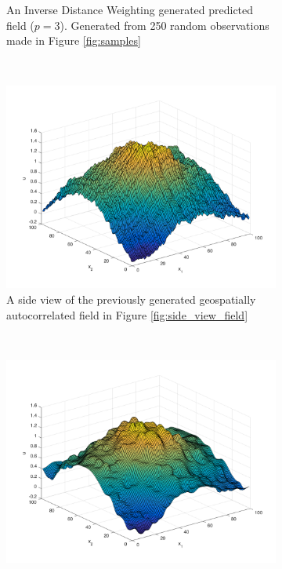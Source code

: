 \documentclass[11pt]{ucthesis}
\begin{document}
\begin{figure}[!]
\begin{subfigure}[t]{0.5\textwidth}
		\captionsetup{skip=0.5\baselineskip, width=0.8\textwidth, size=footnotesize}
		\caption{An Inverse Distance Weighting generated predicted field ($p=3$). Generated from 250 random observations made in Figure \ref{fig:samples}}
		\label{fig:idw_field}
    \end{subfigure}
    \\
    \begin{subfigure}[t]{0.5\textwidth}
        \centering
        \includegraphics[width=\linewidth]{figures/generated_field_side_view.png}
        \captionsetup{skip=0.5\baselineskip, width=0.8\textwidth, size=footnotesize}
        \caption{A side view of the previously generated geospatially autocorrelated field in Figure \ref{fig:side_view_field}}
    \end{subfigure}%
    ~
    \begin{subfigure}[t]{0.5\textwidth}
        \centering
        \includegraphics[width=\linewidth]{figures/idw_side_pred_field.png}

\end{subfigure}
\end{figure}
\end{document}
